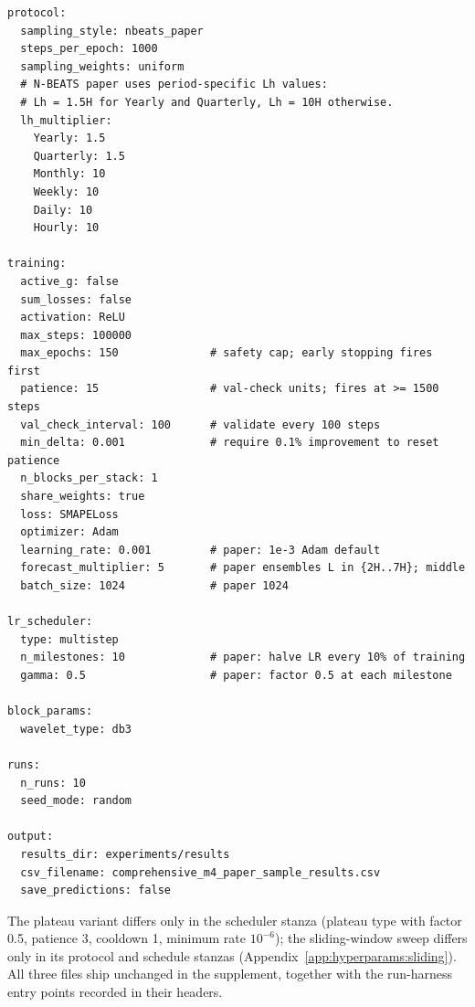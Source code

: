 \begin{verbatim}
protocol:
  sampling_style: nbeats_paper
  steps_per_epoch: 1000
  sampling_weights: uniform
  # N-BEATS paper uses period-specific Lh values:
  # Lh = 1.5H for Yearly and Quarterly, Lh = 10H otherwise.
  lh_multiplier:
    Yearly: 1.5
    Quarterly: 1.5
    Monthly: 10
    Weekly: 10
    Daily: 10
    Hourly: 10

training:
  active_g: false
  sum_losses: false
  activation: ReLU
  max_steps: 100000
  max_epochs: 150              # safety cap; early stopping fires first
  patience: 15                 # val-check units; fires at >= 1500 steps
  val_check_interval: 100      # validate every 100 steps
  min_delta: 0.001             # require 0.1% improvement to reset patience
  n_blocks_per_stack: 1
  share_weights: true
  loss: SMAPELoss
  optimizer: Adam
  learning_rate: 0.001         # paper: 1e-3 Adam default
  forecast_multiplier: 5       # paper ensembles L in {2H..7H}; middle
  batch_size: 1024             # paper 1024

lr_scheduler:
  type: multistep
  n_milestones: 10             # paper: halve LR every 10% of training
  gamma: 0.5                   # paper: factor 0.5 at each milestone

block_params:
  wavelet_type: db3

runs:
  n_runs: 10
  seed_mode: random

output:
  results_dir: experiments/results
  csv_filename: comprehensive_m4_paper_sample_results.csv
  save_predictions: false
\end{verbatim}

The plateau variant differs only in the scheduler stanza (plateau type with
factor 0.5, patience 3, cooldown 1, minimum rate $10^{-6}$); the
sliding-window sweep differs only in its protocol and schedule stanzas
(Appendix~\ref{app:hyperparams:sliding}). All three files ship unchanged in
the supplement, together with the run-harness entry points recorded in
their headers.

